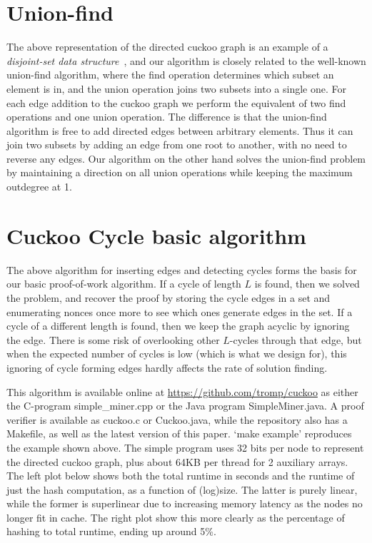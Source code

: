\documentclass[11pt, oneside]{article}
\begin{document}
\section{Union-find}
The above representation of the directed cuckoo graph is an example of
a {\em disjoint-set data structure}~\cite{wikidsds2014}, and our algorithm is
closely related to the well-known union-find algorithm, where the find operation
determines which subset an element is in, and the union operation joins two subsets
into a single one. For each edge addition to the cuckoo graph we perform the equivalent
of two find operations and one union operation.
The difference is that the union-find algorithm is free to add
directed edges between arbitrary elements. Thus it can join two subsets by adding an edge
from one root to another, with no need to reverse any edges.
Our algorithm on the other hand solves the union-find problem by maintaining
a direction on all union operations while keeping the maximum outdegree at 1.

\section{Cuckoo Cycle basic algorithm}
The above algorithm for inserting edges and detecting cycles forms the basis
for our basic proof-of-work algorithm.
If a cycle of length $L$ is found, then we solved the problem, and recover the proof
by storing the cycle edges in a set and enumerating nonces once more to see which ones
generate edges in the set.
If a cycle of a different length is found, then we keep the graph acyclic by ignoring the edge.
There is some risk of overlooking other $L$-cycles
through that edge, but when the expected number of cycles is low (which is what we design for),
this ignoring of cycle forming edges hardly affects the rate of solution finding.

This algorithm is available online at \url{https://github.com/tromp/cuckoo}
as either the C-program simple\_miner.cpp or the Java program SimpleMiner.java.
A proof verifier is available as cuckoo.c or Cuckoo.java, while the repository
also has a Makefile, as well as the latest version of this paper.
`make example' reproduces the example shown above.
The simple program uses 32 bits per node to represent the directed cuckoo graph,
plus about 64KB per thread for 2 auxiliary arrays.
The left plot below shows both the total runtime in seconds and the runtime of just
the hash computation, as a function of (log)size. The latter is purely
linear, while the former is superlinear due to increasing memory latency
as the nodes no longer fit in cache. The right plot show this more clearly
as the percentage of hashing to total runtime, ending up around 5\%.
\end{document}
